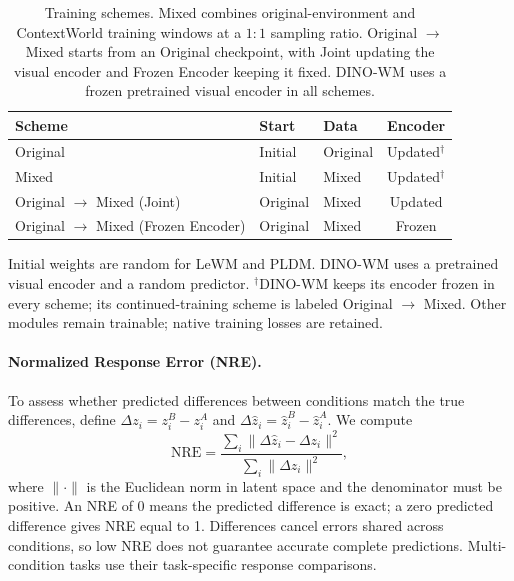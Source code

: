 \begin{table}[!b]
\centering
\footnotesize
\caption{Training schemes.
Mixed combines original-environment and ContextWorld training windows at a $1:1$ sampling ratio.
Original $\rightarrow$ Mixed starts from an Original checkpoint, with Joint updating the visual encoder and Frozen Encoder keeping it fixed.
DINO-WM uses a frozen pretrained visual encoder in all schemes.}
\label{tab:training-schemes}
\begin{tabularx}{\columnwidth}{@{}p{}XXc@{}}
\toprule
Scheme & Start & Data & Encoder \\
\midrule
Original & Initial & Original & Updated$^\dagger$ \\
Mixed & Initial & Mixed & Updated$^\dagger$ \\
Original $\to$ Mixed (Joint) & Original & Mixed & Updated \\
Original $\to$ Mixed (Frozen Encoder) & Original & Mixed & Frozen \\
\bottomrule
\end{tabularx}
\par\smallskip
\begin{minipage}{\columnwidth}
\footnotesize
Initial weights are random for LeWM and PLDM. DINO-WM uses a pretrained visual encoder and a random predictor.
$^\dagger$DINO-WM keeps its encoder frozen in every scheme; its continued-training scheme is labeled Original $\to$ Mixed.
Other modules remain trainable; native training losses are retained.
\end{minipage}
\end{table}



\paragraph{Normalized Response Error (NRE).}
To assess whether predicted differences between conditions match the true differences, define $\Delta z_i=z_i^B-z_i^A$ and $\Delta\hat z_i=\hat z_i^B-\hat z_i^A$.
We compute
\begin{equation}
\mathrm{NRE}=\frac{\sum_i\|\Delta\hat z_i-\Delta z_i\|^2}{\sum_i\|\Delta z_i\|^2},
\label{eq:response-error}
\end{equation}
where $\|\cdot\|$ is the Euclidean norm in latent space and the denominator must be positive.
An NRE of 0 means the predicted difference is exact; a zero predicted difference gives NRE equal to 1.
Differences cancel errors shared across conditions, so low NRE does not guarantee accurate complete predictions.
Multi-condition tasks use their task-specific response comparisons.


